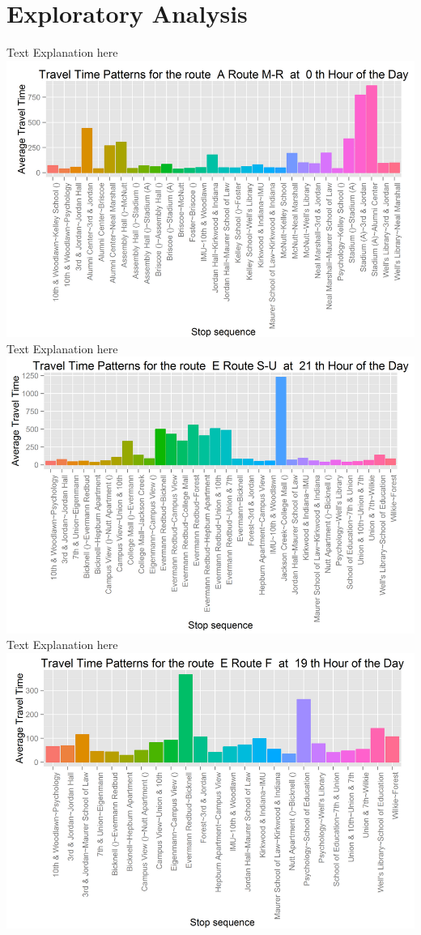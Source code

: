\documentclass[12pt]{article}
\begin{document}
\section{Exploratory Analysis}
Text Explanation here\\
\includegraphics[scale=0.6]{resources/ggplot1}\\[1cm] 
Text Explanation here\\
\includegraphics[scale=0.6]{resources/ggplot2}\\[1cm] 
Text Explanation here\\
\includegraphics[scale=0.6]{resources/ggplot3}\\[1cm] 
\end{document}
